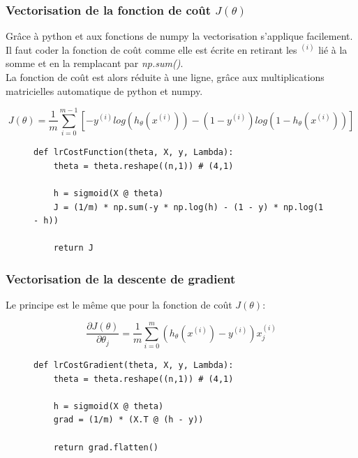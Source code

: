 \subsubsection{Vectorisation de la fonction de coût $J(\theta)$}

Grâce à python et aux fonctions de numpy la vectorisation s'applique facilement. Il faut coder la fonction de coût comme elle est écrite en retirant les $^{(i)}$ lié à la somme et en la remplacant par \textit{np.sum()}. \\
La fonction de coût est alors réduite à une ligne, grâce aux multiplications matricielles automatique de python et numpy.

\begin{equation}\label{eq:cout}
    J(\theta) = \frac{1}{m} \sum_{i=0}^{m-1}[-y^{(i)} log(h_\theta(x^{(i)})) - (1-y^{(i)}) log(1-h_\theta(x^{(i)}))]
\end{equation}

\begin{figure}[!h]
\begin{verbatim}
def lrCostFunction(theta, X, y, Lambda):
    theta = theta.reshape((n,1)) # (4,1)
 
    h = sigmoid(X @ theta)
    J = (1/m) * np.sum(-y * np.log(h) - (1 - y) * np.log(1 - h))
      
    return J
\end{verbatim}   
\end{figure}

\subsubsection{Vectorisation de la descente de gradient}
\noindent
Le principe est le même que pour la fonction de coût $J(\theta)$:

\begin{equation}\label{eq:descente-gradient}
    \frac{\partial J(\theta)}{\partial \theta_j} = \frac{1}{m} \sum_{i=0}^{m} (h_\theta(x^{(i)}) - y^{(i)}) x_j^{(i)}
\end{equation}

\begin{figure}[!h]
\begin{verbatim}
def lrCostGradient(theta, X, y, Lambda):
    theta = theta.reshape((n,1)) # (4,1)

    h = sigmoid(X @ theta)
    grad = (1/m) * (X.T @ (h - y))

    return grad.flatten()
\end{verbatim}   
\end{figure}


